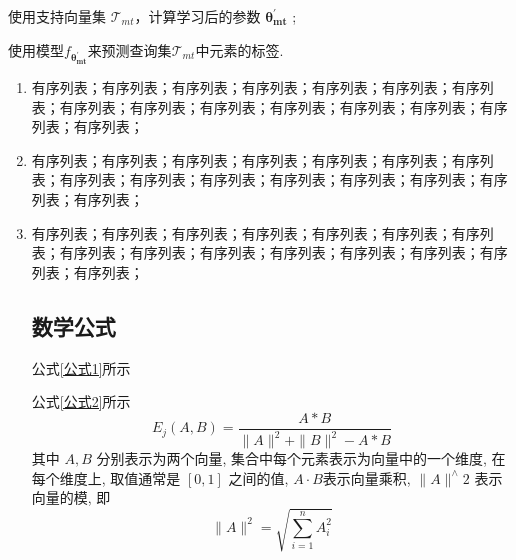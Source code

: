 \documentclass{template} %
\begin{document}
\begin{multicols}{2}
\begin{algorithm}[H]
	
	
	使用支持向量集 $\mathcal{T}_{mt}$，计算学习后的参数 $\bm{{\theta}^{\prime}_{mt}}$ ; 
	
	使用模型$f_{\bm{{\theta}_{mt}^{\prime}}}$来预测查询集$\mathcal{T}_{mt}$中元素的标签.

\end{algorithm}
\vspace{0.5em}

    \begin{enumerate}
        \item 有序列表；有序列表；有序列表；有序列表；有序列表；有序列表；有序列表；有序列表；有序列表；有序列表；有序列表；有序列表；有序列表；有序列表；有序列表；
        \item 有序列表；有序列表；有序列表；有序列表；有序列表；有序列表；有序列表；有序列表；有序列表；有序列表；有序列表；有序列表；有序列表；有序列表；有序列表；
        \item 有序列表；有序列表；有序列表；有序列表；有序列表；有序列表；有序列表；有序列表；有序列表；有序列表；有序列表；有序列表；有序列表；有序列表；有序列表；

\subsection{数学公式}
公式\eqref{公式1}所示

公式\eqref{公式2}所示
\begin{equation}
\label{公式1}
    E_j(A, B)=\frac{A * B}{\|A\|^2+\|B\|^2-A * B}
\end{equation}
其中 $A, B$ 分别表示为两个向量, 集合中每个元素表示为向量中的一个维度, 在每个维度上, 取值通常是 $[0,1]$ 之间的值, $A\cdot B$表示向量乘积, $\|A\|^{\wedge} 2$ 表示向量的模, 即
\begin{equation}
\label{公式2}
    \|A\|^2=\sqrt{\sum_{i=1}^n A_i^2}
\end{equation}

    \end{enumerate}



\end{multicols}
\end{document}
